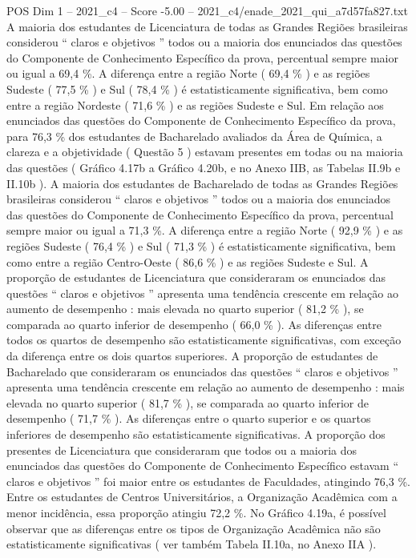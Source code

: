 \begin{textsample}{POS Dim 1 – 2021\_c4 – Score -5.00 – 2021\_c4/enade\_2021\_qui\_a7d57fa827.txt}
A maioria dos estudantes de Licenciatura de todas as Grandes Regiões brasileiras considerou “ claros e objetivos ” todos ou a maioria dos enunciados das questões do Componente de Conhecimento Específico da prova, percentual sempre maior ou igual a 69,4 \%.
A diferença entre a região Norte ( 69,4 \% ) e as regiões Sudeste ( 77,5 \% ) e Sul ( 78,4 \% ) é estatisticamente significativa, bem como entre a região Nordeste ( 71,6 \% ) e as regiões Sudeste e Sul.
Em relação aos enunciados das questões do Componente de Conhecimento Específico da prova, para 76,3 \% dos estudantes de Bacharelado avaliados da Área de Química, a clareza e a objetividade ( Questão 5 ) estavam presentes em todas ou na maioria das questões ( Gráfico 4.17b a Gráfico 4.20b, e no Anexo IIB, as Tabelas II.9b e II.10b ).
A maioria dos estudantes de Bacharelado de todas as Grandes Regiões brasileiras considerou “ claros e objetivos ” todos ou a maioria dos enunciados das questões do Componente de Conhecimento Específico da prova, percentual sempre maior ou igual a 71,3 \%.
A diferença entre a região Norte ( 92,9 \% ) e as regiões Sudeste ( 76,4 \% ) e Sul ( 71,3 \% ) é estatisticamente significativa, bem como entre a região Centro-Oeste ( 86,6 \% ) e as regiões Sudeste e Sul.
A proporção de estudantes de Licenciatura que consideraram os enunciados das questões “ claros e objetivos ” apresenta uma tendência crescente em relação ao aumento de desempenho : mais elevada no quarto superior ( 81,2 \% ), se comparada ao quarto inferior de desempenho ( 66,0 \% ).
As diferenças entre todos os quartos de desempenho são estatisticamente significativas, com exceção da diferença entre os dois quartos superiores.
A proporção de estudantes de Bacharelado que consideraram os enunciados das questões “ claros e objetivos ” apresenta uma tendência crescente em relação ao aumento de desempenho : mais elevada no quarto superior ( 81,7 \% ), se comparada ao quarto inferior de desempenho ( 71,7 \% ).
As diferenças entre o quarto superior e os quartos inferiores de desempenho são estatisticamente significativas.
A proporção dos presentes de Licenciatura que consideraram que todos ou a maioria dos enunciados das questões do Componente de Conhecimento Específico estavam “ claros e objetivos ” foi maior entre os estudantes de Faculdades, atingindo 76,3 \%.
Entre os estudantes de Centros Universitários, a Organização Acadêmica com a menor incidência, essa proporção atingiu 72,2 \%.
No Gráfico 4.19a, é possível observar que as diferenças entre os tipos de Organização Acadêmica não são estatisticamente significativas ( ver também Tabela II.10a, no Anexo IIA ).

\end{textsample}
